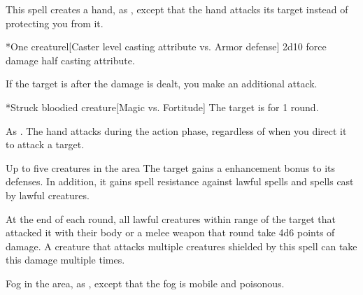 \spellrng{\rngmed}
\spelldur{\durshort \dismissable}
\spellline
\spelleffect This spell creates a hand, as , except that the hand attacks its target instead of protecting you from it.
\begin{spelltarget}*{One creature}l[Caster level \add casting attribute vs. Armor defense]
    \spellsuccess 2d10 force damage \add half casting attribute.

    If the target is \bloodied after the damage is dealt, you make an additional attack.
    \begin{spelltarget}*{Struck bloodied creature}[Magic vs. Fortitude]
        \spellsuccess The target is \dazed for 1 round.
    \end{spelltarget}
\end{spelltarget}
\spellnotes As . The hand attacks during the action phase, regardless of when you direct it to attack a target.

\spelldur{\durshort \dismissable}
\begin{spelltargets}{Up to five creatures in the area}
    The target gains a  enhancement bonus to its defenses. In addition, it gains spell resistance against lawful spells and spells cast by lawful creatures.
    \par At the end of each round, all lawful creatures within \rngclose range of the target that attacked it with their body or a melee weapon that round take 4d6 points of damage. A creature that attacks multiple creatures shielded by this spell can take this damage multiple times.
\end{spelltargets}

\spelldur{\durshort}
\spellline
\spelleffect Fog in the area, as , except that the fog is mobile and poisonous.

